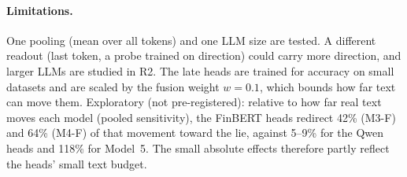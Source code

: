 \paragraph{Limitations.}
One pooling (mean over all tokens) and one LLM size are tested. A different readout (last token,
a probe trained on direction) could carry more direction, and larger LLMs are studied in R2. The
late heads are trained for accuracy on small datasets and are scaled by the fusion weight
$w=0.1$, which bounds how far text can move them. Exploratory (not pre-registered): relative to
how far real text moves each model (pooled sensitivity), the FinBERT heads redirect 42\% (M3-F)
and 64\% (M4-F) of that movement toward the lie, against 5--9\% for the Qwen heads and 118\% for
Model~5. The small absolute effects therefore partly reflect the heads' small text budget.
